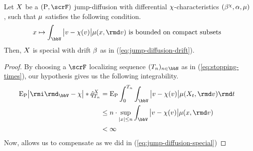 \begin{lemma}
  \label{lemma:special}
  Let $X$ be a $(\Prb, \scrF)$ jump-diffusion with differential $\chi$-characteristics $(\beta^\chi, \alpha, \mu)$, such that $\mu$ satisfies the following condition.
  \begin{equation*}
    \stateVar \mapsto \int_\vecSpace \big|\markVar - \trunc(\markVar) \big| \affJump(\stateVar, \rmd\markVar) \text{ is bounded on compact subsets}
  \end{equation*}
  Then, $X$ is special with drift $\beta$ as in (\ref{eq:jump-diffusion-drift}).
\end{lemma}
\begin{proof}
  \label{proof:lemma:special}
  By choosing a $\scrF$ localizing sequence $(T_n)_{n\in\bbN}$ as in (\ref{eq:stopping-times}), our hypothesis gives us the following integrability.
  \begin{align*}
    \Exp_\Prb\big| \id_\vecSpace- \trunc \big| \ast \predproj{\jumpMeas^\X}_{T_n}
    &= \Exp_\Prb \int_0^{T_n} \int_\vecSpace \big|\markVar - \trunc(\markVar)\big| \affJump(\X_t, \rmd\markVar) \rmd t\\
    &\leq n \cdot \sup_{|\stateVar|\leq n} \int_\vecSpace \big|\markVar-\trunc(\markVar)\big| \affJump(\stateVar, \rmd\markVar) \\
    &< \infty
  \end{align*}
  Now, \cite[Proposition II.1.28]{jacod2003} allows us to compensate as we did in (\ref{eq:jump-diffusion-special})
\end{proof}
